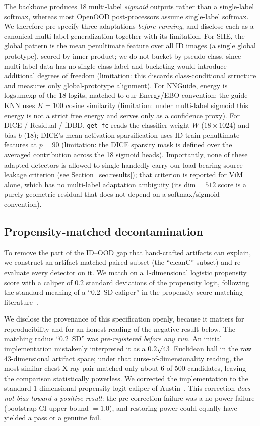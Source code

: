 \documentclass{article}
\begin{document}
The backbone produces 18 multi-label \emph{sigmoid} outputs rather than a
single-label softmax, whereas most OpenOOD post-processors assume single-label
softmax. We therefore pre-specify three adaptations \emph{before running}, and
disclose each as a canonical multi-label generalization together with its
limitation. For SHE, the global pattern is the mean penultimate feature over all
ID images (a single global prototype), scored by inner product; we do not bucket
by pseudo-class, since multi-label data has no single class label and bucketing
would introduce additional degrees of freedom (limitation: this discards
class-conditional structure and measures only global-prototype alignment). For
NNGuide, energy is $\mathrm{logsumexp}$ of the 18 logits, matched to our
Energy/EBO convention; the guide KNN uses $K=100$ cosine similarity (limitation:
under multi-label sigmoid this energy is not a strict free energy and serves only
as a confidence proxy). For DICE / Residual / fDBD, \texttt{get\_fc} reads the
classifier weight $W$ ($18\times1024$) and bias $b$ (18); DICE's mean-activation
sparsification uses ID-train penultimate features at $p=90$ (limitation: the DICE
sparsity mask is defined over the averaged contribution across the 18 sigmoid
heads). Importantly, none of these adapted detectors is allowed to single-handedly
carry our load-bearing source-leakage criterion (see Section~\ref{sec:results});
that criterion is reported for ViM alone, which has no multi-label adaptation
ambiguity (its $\text{dim}=512$ score is a purely geometric residual that does not
depend on a softmax/sigmoid convention).

\subsection{Propensity-matched decontamination}

To remove the part of the ID--OOD gap that hand-crafted artifacts can explain, we
construct an artifact-matched paired subset (the ``cleanC'' subset) and
re-evaluate every detector on it. We match on a 1-dimensional logistic propensity
score with a caliper of $0.2$ standard deviations of the propensity logit,
following the standard meaning of a ``$0.2$~SD caliper'' in the
propensity-score-matching literature~\citep{austin2011caliper,lunt2014caliper}.

We disclose the provenance of this specification openly, because it matters for
reproducibility and for an honest reading of the negative result below. The
matching radius ``$0.2$~SD'' was \emph{pre-registered before any run}. An initial
implementation mistakenly interpreted it as a $0.2\sqrt{43}$ Euclidean ball in
the raw 43-dimensional artifact space; under that curse-of-dimensionality
reading, the most-similar chest-X-ray pair matched only about 6 of 500
candidates, leaving the comparison statistically powerless. We corrected the
implementation to the standard 1-dimensional propensity-logit caliper of
Austin~\citep{austin2011caliper}. This correction \emph{does not bias toward a
positive result}: the pre-correction failure was a no-power failure (bootstrap CI
upper bound $=1.0$), and restoring power could equally have yielded a pass or a
genuine fail.
\end{document}
